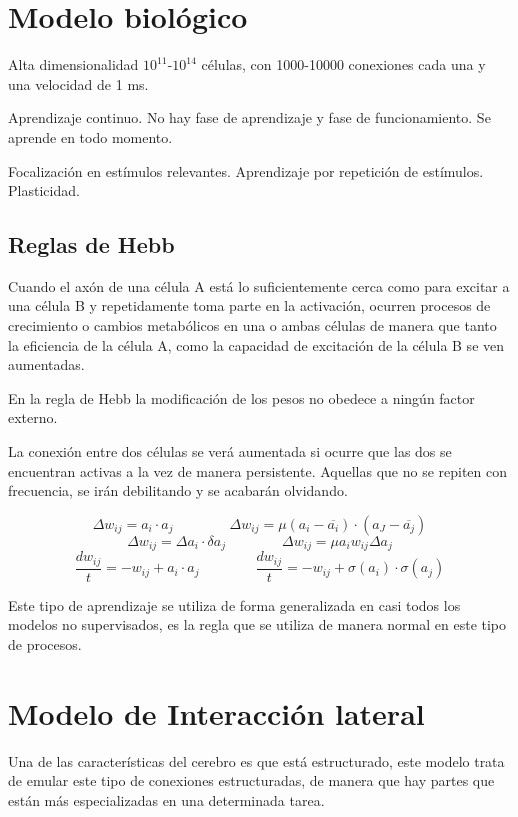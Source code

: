 \documentclass[12pt, twoside, openright]{report} %
\begin{document}
\section{Modelo biológico}
Alta dimensionalidad $10^{11}$-$10^{14}$ células, con 1000-10000 conexiones cada una y una velocidad de 1 ms.

Aprendizaje continuo. No hay fase de aprendizaje y fase de funcionamiento. Se aprende en todo momento.

Focalización en estímulos relevantes. Aprendizaje por repetición de estímulos. Plasticidad.

\subsection{Reglas de Hebb}
Cuando el axón de una célula A está lo suficientemente cerca como para excitar a una célula B y repetidamente toma parte en la activación, ocurren procesos de crecimiento o cambios metabólicos en una o ambas células de manera que tanto la eficiencia de la célula A, como la capacidad de excitación de la célula B se ven aumentadas.

En la regla de Hebb la modificación de los pesos no obedece a ningún factor externo.

La conexión entre dos células se verá aumentada si ocurre que las dos se encuentran activas a la vez de manera persistente. Aquellas que no se repiten con frecuencia, se irán debilitando y se acabarán olvidando.

$$\Delta w_{ij}=a_i\cdot a_j \quad\quad\quad\quad \Delta w_{ij}=\mu(a_i - \overline{a_i})\cdot(a_J- \overline{a_j})$$
$$\Delta w_{ij}=\Delta a_i\cdot \delta a_j \quad\quad\quad\quad \Delta w_{ij}= \mu a_i w_{ij} \Delta a_j$$
$$\frac{dw_{ij}}{t}=-w_{ij}+a_i\cdot a_j \quad\quad\quad\quad \frac{dw_{ij}}{t}=-w_{ij} + \sigma(a_i) \cdot \sigma(a_j)$$

Este tipo de aprendizaje se utiliza de forma generalizada en casi todos los modelos no supervisados, es la regla que se utiliza de manera normal en este tipo de procesos.

\section{Modelo de Interacción lateral}
Una de las características del cerebro es que está estructurado, este modelo trata de emular este tipo de conexiones estructuradas, de manera que hay partes que están más especializadas en una determinada tarea.
\end{document}
